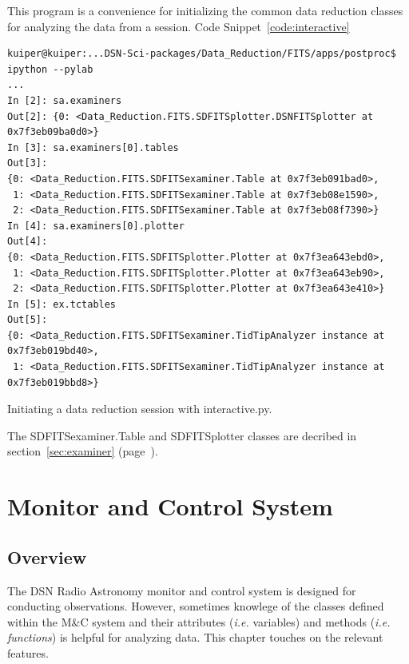 \documentclass[letterpaper,11pt]{book}
\begin{document}
This program is a convenience for initializing the common data reduction classes
for analyzing the data from a session. Code Snippet~\ref{code:interactive} 
\begin{code}[h!tb]
\begin{center}
{\small \begin{verbatim}
kuiper@kuiper:...DSN-Sci-packages/Data_Reduction/FITS/apps/postproc$ ipython --pylab
...
In [2]: sa.examiners
Out[2]: {0: <Data_Reduction.FITS.SDFITSplotter.DSNFITSplotter at 0x7f3eb09ba0d0>}
In [3]: sa.examiners[0].tables
Out[3]: 
{0: <Data_Reduction.FITS.SDFITSexaminer.Table at 0x7f3eb091bad0>,
 1: <Data_Reduction.FITS.SDFITSexaminer.Table at 0x7f3eb08e1590>,
 2: <Data_Reduction.FITS.SDFITSexaminer.Table at 0x7f3eb08f7390>}
In [4]: sa.examiners[0].plotter
Out[4]: 
{0: <Data_Reduction.FITS.SDFITSplotter.Plotter at 0x7f3ea643ebd0>,
 1: <Data_Reduction.FITS.SDFITSplotter.Plotter at 0x7f3ea643eb90>,
 2: <Data_Reduction.FITS.SDFITSplotter.Plotter at 0x7f3ea643e410>}
In [5]: ex.tctables
Out[5]: 
{0: <Data_Reduction.FITS.SDFITSexaminer.TidTipAnalyzer instance at 0x7f3eb019bd40>,
 1: <Data_Reduction.FITS.SDFITSexaminer.TidTipAnalyzer instance at 0x7f3eb019bbd8>}
\end{verbatim}
}\caption[Program {\ttfamily interactive.py}]{\label{code:interactive}
Initiating a data reduction session with {\ttfamily interactive.py}.}
\end{center}
\end{code}
The {\ttfamily SDFITSexaminer.Table} and {\ttfamily SDFITSplotter} classes are 
decribed in section~\ref{sec:examiner} (page~\pageref{sec:examiner}).



\chapter{Monitor and Control System}\label{chap:MandC}

\section{Overview}

The DSN Radio Astronomy monitor and control system is designed for conducting
observations.  However, sometimes knowlege of the classes defined within the
M\&C system and their attributes ({\itshape i.e.} variables) and methods
({\itshape i.e. functions}) is helpful for analyzing data. This chapter touches
on the relevant features.

\appendix
\end{document}
